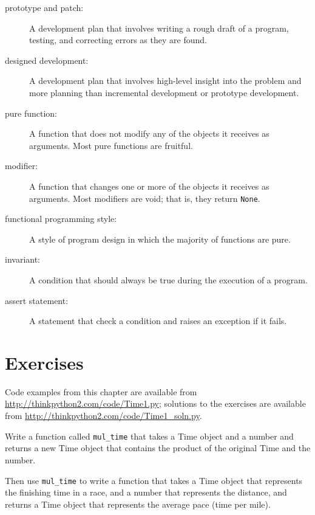 \documentclass[10pt]{book}
\begin{document}
\begin{description}

\item[prototype and patch:] A development plan that involves
writing a rough draft of a program, testing, and correcting errors as
they are found.

\item[designed development:] A development plan that involves
high-level insight into the problem and more planning than incremental
development or prototype development.

\item[pure function:] A function that does not modify any of the objects it
receives as arguments.  Most pure functions are fruitful.

\item[modifier:] A function that changes one or more of the objects it
  receives as arguments.  Most modifiers are void; that is, they
  return {\tt None}.  

\item[functional programming style:] A style of program design in which the
majority of functions are pure.

\item[invariant:] A condition that should always be true during the
execution of a program.

\item[assert statement:] A statement that check a condition and raises
an exception if it fails.

\end{description}


\section{Exercises}

Code examples from this chapter are available from
\url{http://thinkpython2.com/code/Time1.py}; solutions to the
exercises are available from \url{http://thinkpython2.com/code/Time1_soln.py}.

\begin{exercise}

Write a function called \verb"mul_time" that takes a Time object
and a number and returns a new Time object that contains
the product of the original Time and the number.

Then use \verb"mul_time" to write a function that takes a Time
object that represents the finishing time in a race, and a number
that represents the distance, and returns a Time object that represents
the average pace (time per mile).

\end{exercise}
\end{document}
